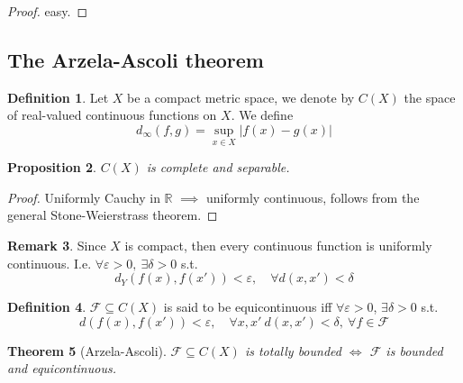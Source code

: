 \documentclass[11pt,a4paper]{article}
\theoremstyle{definition}
\newtheorem{definition}{Definition}[section]
\newtheorem{remark}[definition]{Remark}
\theoremstyle{plain}
\newtheorem{theorem}[definition]{Theorem}
\newtheorem{proposition}[definition]{Proposition}
\theoremstyle{remark}
\newcommand{\R}{\mathbb{R}}
\newcommand{\abs}[1]{\lvert #1 \rvert}
\newcommand{\1}{\mathbbm{1}}
\begin{document}
\begin{proof}
    easy.
\end{proof}

\subsection{The Arzela-Ascoli theorem} 

\begin{definition}
    Let $X$ be a compact metric space, we denote by $C(X)$ the space of real-valued continuous functions on $X$. We define 
    $$d_\infty(f, g) = \sup_{x \in X} \abs{f(x) - g(x)}$$
\end{definition}

\begin{proposition}
    $C(X)$ is complete and separable.
\end{proposition}

\begin{proof}
    Uniformly Cauchy in $\R$ $\implies$ uniformly continuous, follows from the general Stone-Weierstrass theorem.
\end{proof}

\begin{remark}
    Since $X$ is compact, then every continuous function is uniformly continuous. I.e. $\forall \varepsilon > 0, \ \exists \delta > 0$ s.t. 
    $$d_Y(f(x), f(x')) < \varepsilon, \quad \forall d(x, x') < \delta$$
\end{remark}


\begin{definition}
    $\mathcal{F} \subseteq C(X)$ is said to be equicontinuous iff $\forall \varepsilon > 0$, $\exists \delta > 0$ s.t. 
    $$d(f(x), f(x')) < \varepsilon, \quad \forall x, x' \ d(x,x') < \delta, \ \forall f \in \mathcal{F}$$
\end{definition}

\begin{theorem}[Arzela-Ascoli]
    $\mathcal{F} \subseteq C(X)$ is totally bounded $\iff$ $\mathcal{F}$ is bounded and equicontinuous.
\end{theorem}
\end{document}
